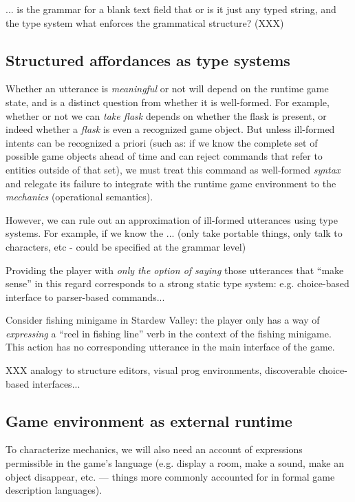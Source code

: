   ... is the grammar for a blank text field that or is it just any typed
  string, and the type system what enforces the grammatical structure?
  (XXX)

  \subsection{Structured affordances as type systems}
  
  Whether an utterance is {\em meaningful} or not will depend on
  the runtime game state, and is a distinct question from whether it is
  well-formed. For example, whether or not we can {\em take
  flask} depends on whether the flask is present, or indeed whether a {\em
  flask} is even a recognized game object. But unless ill-formed intents can be
  recognized a priori (such as: if we know the complete set of possible
  game objects ahead of time and can reject commands that refer to entities
  outside of that set), we must treat this command as well-formed {\em
  syntax} and relegate its failure to integrate with the runtime game
  environment to the {\em mechanics} (operational semantics).

  However, we can rule out an approximation of ill-formed utterances using
  type systems. For example, if we know the ...
  (only take portable things, only talk to characters, etc - could be
  specified at the grammar level)
  
  Providing the player with {\em only the option of saying} those
  utterances that ``make sense'' in this regard corresponds to a strong
  static type system: e.g. choice-based interface to parser-based
  commands...

  Consider fishing minigame in Stardew Valley: the player only has a way of
  {\em expressing} a ``reel in fishing line'' verb in the context of the
  fishing minigame. This action has no corresponding utterance in the main
  interface of the game.

  XXX analogy to structure editors, visual prog environments, discoverable
  choice-based interfaces...


  \subsection{Game environment as external runtime}

  To characterize mechanics, we will also need an account of expressions
  permissible in the game's language (e.g. display a room, make a sound,
  make an object disappear, etc. --- things more commonly accounted for in
  formal game description languages). 

